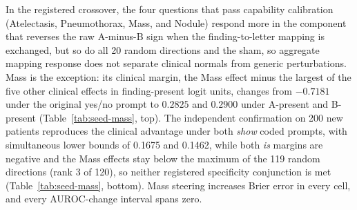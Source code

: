 \documentclass{article}
\begin{document}
In the registered crossover, the four questions that pass capability calibration (Atelectasis, Pneumothorax, Mass, and Nodule) respond more in the component that reverses the raw A-minus-B sign when the finding-to-letter mapping is exchanged, but so do all 20 random directions and the sham, so aggregate mapping response does not separate clinical normals from generic perturbations. Mass is the exception: its clinical margin, the Mass effect minus the largest of the five other clinical effects in finding-present logit units, changes from $-0.7181$ under the original yes/no prompt to $0.2825$ and $0.2900$ under A-present and B-present (Table~\ref{tab:seed-mass}, top). The independent confirmation on 200 new patients reproduces the clinical advantage under both \textit{show} coded prompts, with simultaneous lower bounds of 0.1675 and 0.1462, while both \textit{is} margins are negative and the Mass effects stay below the maximum of the 119 random directions (rank 3 of 120), so neither registered specificity conjunction is met (Table~\ref{tab:seed-mass}, bottom). Mass steering increases Brier error in every cell, and every AUROC-change interval spans zero.
\end{document}
